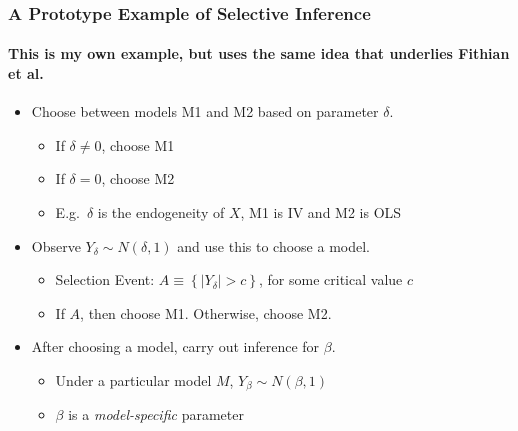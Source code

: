 \begin{frame}
  \frametitle{A Prototype Example of Selective Inference}
  \framesubtitle{This is my own example, but uses the same idea that underlies Fithian et al.}
  \small
 
  \begin{itemize}
    \item Choose between models M1 and M2 based on parameter $\delta$. 
      \begin{itemize} 
        \item If $\delta \neq 0$, choose M1 
        \item If $\delta = 0$, choose M2
        \item E.g.\ $\delta$ is the endogeneity of $X$, M1 is IV and M2 is OLS
  \end{itemize}
\item Observe $Y_\delta \sim N(\delta, 1)$ and use this to choose a model.
  \begin{itemize}
    \item Selection Event: $A \equiv \left\{ |Y_\delta| >c \right\}$, for some critical value $c$ 
    \item If $A$, then choose M1. Otherwise, choose M2.
  \end{itemize}
\item After choosing a model, carry out inference for $\beta$.
  \begin{itemize}
    \item Under a particular model $M$, $Y_\beta \sim N(\beta,1)$
    \item $\beta$ is a \emph{model-specific} parameter
  \end{itemize}

  \end{itemize}

  
  


\end{frame}

